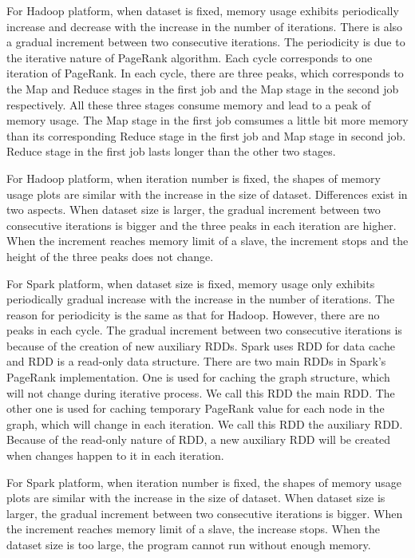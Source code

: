 \documentclass[12pt,conference,letterpaper]{IEEEtran}
\begin{document}
For Hadoop platform, when dataset is fixed, memory usage exhibits periodically increase and decrease with the increase in the number of iterations. There is also a gradual increment between two consecutive iterations. The periodicity is due to the iterative nature of PageRank algorithm. Each cycle corresponds to one iteration of PageRank. In each cycle, there are three peaks, which corresponds to the Map and Reduce stages in the first job and the Map stage in the second job respectively. All these three stages consume memory and lead to a peak of memory usage. The Map stage in the first job comsumes a little bit more memory than its corresponding Reduce stage in the first job and Map stage in second job. Reduce stage in the first job lasts longer than the other two stages. 

For Hadoop platform, when iteration number is fixed, the shapes of memory usage plots are similar with the increase in the size of dataset. Differences exist in two aspects. When dataset size is larger, the gradual increment between two consecutive iterations is bigger and the three peaks in each iteration are higher. When the increment reaches memory limit of a slave, the increment stops and the height of the three peaks does not change.

For Spark platform, when dataset size is fixed, memory usage only exhibits periodically gradual increase with the increase in the number of iterations. The reason for periodicity is the same as that for Hadoop. However, there are no peaks in each cycle. The gradual increment between two consecutive iterations is because of the creation of new auxiliary RDDs. Spark uses RDD for data cache and RDD is a read-only data structure. There are two main RDDs in Spark's PageRank implementation. One is used for caching the graph structure, which will not change during iterative process. We call this RDD the main RDD. The other one is used for caching temporary PageRank value for each node in the graph, which will change in each iteration. We call this RDD the auxiliary RDD. Because of the read-only nature of RDD, a new auxiliary RDD will be created when changes happen to it in each iteration.

For Spark platform, when iteration number is fixed, the shapes of memory usage plots are similar with the increase in the size of dataset. When dataset size is larger, the gradual increment between two consecutive iterations is bigger. When the increment reaches memory limit of a slave, the increase stops. When the dataset size is too large, the program cannot run without enough memory.
\end{document}
